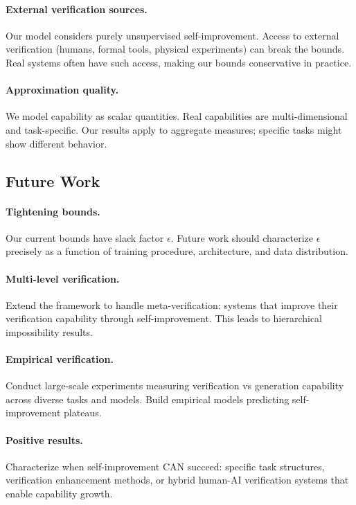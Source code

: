\documentclass{article}
\theoremstyle{definition}
\theoremstyle{remark}
\begin{document}
\paragraph{External verification sources.} Our model considers purely unsupervised self-improvement. Access to external verification (humans, formal tools, physical experiments) can break the bounds. Real systems often have such access, making our bounds conservative in practice.

\paragraph{Approximation quality.} We model capability as scalar quantities. Real capabilities are multi-dimensional and task-specific. Our results apply to aggregate measures; specific tasks might show different behavior.

\subsection{Future Work}

\paragraph{Tightening bounds.} Our current bounds have slack factor \(\epsilon\). Future work should characterize \(\epsilon\) precisely as a function of training procedure, architecture, and data distribution.

\paragraph{Multi-level verification.} Extend the framework to handle meta-verification: systems that improve their verification capability through self-improvement. This leads to hierarchical impossibility results.

\paragraph{Empirical verification.} Conduct large-scale experiments measuring verification vs generation capability across diverse tasks and models. Build empirical models predicting self-improvement plateaus.

\paragraph{Positive results.} Characterize when self-improvement CAN succeed: specific task structures, verification enhancement methods, or hybrid human-AI verification systems that enable capability growth.
\end{document}
